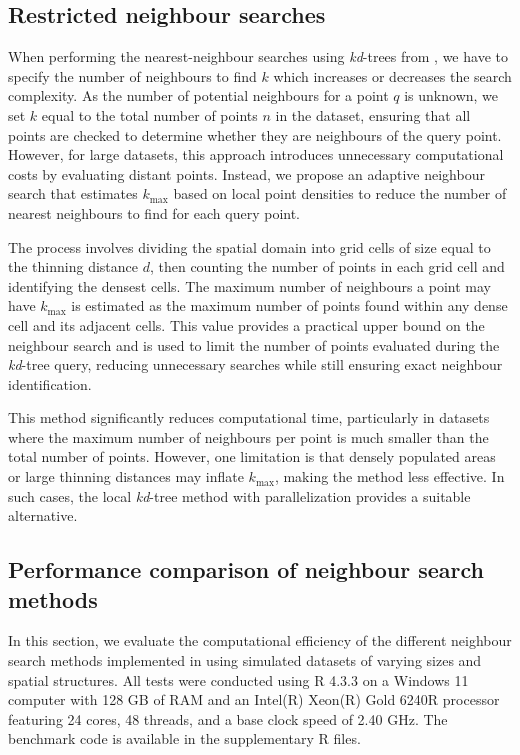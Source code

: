 \subsection{Restricted neighbour searches}\label{restricted-neighbour-searches}

When performing the nearest-neighbour searches using \emph{kd}-trees from , we have to specify the number of neighbours to find \(k\) which increases or decreases the search complexity. As the number of potential neighbours for a point \(q\) is unknown, we set \(k\) equal to the total number of points \(n\) in the dataset, ensuring that all points are checked to determine whether they are neighbours of the query point. However, for large datasets, this approach introduces unnecessary computational costs by evaluating distant points. Instead, we propose an adaptive neighbour search that estimates \(k_{\text{max}}\) based on local point densities to reduce the number of nearest neighbours to find for each query point.

The process involves dividing the spatial domain into grid cells of size equal to the thinning distance \(d\), then counting the number of points in each grid cell and identifying the densest cells. The maximum number of neighbours a point may have \(k_{\text{max}}\) is estimated as the maximum number of points found within any dense cell and its adjacent cells. This value provides a practical upper bound on the neighbour search and is used to limit the number of points evaluated during the \emph{kd}-tree query, reducing unnecessary searches while still ensuring exact neighbour identification.

This method significantly reduces computational time, particularly in datasets where the maximum number of neighbours per point is much smaller than the total number of points. However, one limitation is that densely populated areas or large thinning distances may inflate \(k_{\text{max}}\), making the method less effective. In such cases, the local \emph{kd}-tree method with parallelization provides a suitable alternative.

\subsection{Performance comparison of neighbour search methods}\label{performancesearchtype}

In this section, we evaluate the computational efficiency of the different neighbour search methods implemented in  using simulated datasets of varying sizes and spatial structures. All tests were conducted using R 4.3.3 on a Windows 11 computer with 128 GB of RAM and an Intel(R) Xeon(R) Gold 6240R processor featuring 24 cores, 48 threads, and a base clock speed of 2.40 GHz. The benchmark code is available in the supplementary R files.


